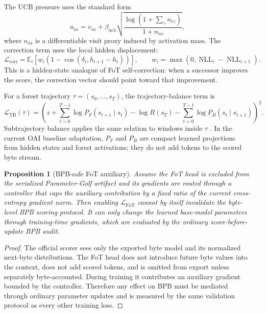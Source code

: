 \documentclass[11pt]{article}
\theoremstyle{definition}
\theoremstyle{plain}
\newtheorem{proposition}[definition]{Proposition}
\theoremstyle{remark}
\numberwithin{equation}{section}
\newcommand{\Eop}{\mathbb{E}}
\begin{document}
The UCB pressure uses the standard form
\begin{equation}
  u_{i\alpha}=v_{i\alpha}+
  \beta_{\mathrm{ucb}}
  \sqrt{
    \frac{\log(1+\sum_\gamma n_{i\gamma})}
         {1+n_{i\alpha}}
  },
\end{equation}
where $n_{i\alpha}$ is a differentiable visit proxy induced by activation mass.  The correction term uses the local hidden displacement:
\begin{equation}
  \mathcal L_{\mathrm{corr}}
  =
  \Eop_i
  \left[
    w_i\left(1-\cos(\delta_i,h_{i+1}-h_i)\right)
  \right],
  \qquad
  w_i=\max(0,\operatorname{NLL}_i-\operatorname{NLL}_{i+1}) .
\end{equation}
This is a hidden-state analogue of FoT self-correction: when a successor improves the score, the correction vector should point toward that improvement.

For a forest trajectory $\tau=(s_0,\ldots,s_T)$, the trajectory-balance term is
\begin{equation}
  \mathcal L_{\mathrm{TB}}(\tau)=
  \left(
    z+\sum_{t=0}^{T-1}\log P_F(s_{t+1}\mid s_t)
    -\log R(s_T)
    -\sum_{t=0}^{T-1}\log P_B(s_t\mid s_{t+1})
  \right)^2 .
\end{equation}
Subtrajectory balance applies the same relation to windows inside $\tau$ \cite{madan2023subtb}.  In the current OAI baseline adaptation, $P_F$ and $P_B$ are compact learned projections from hidden states and forest activations; they do not add tokens to the scored byte stream.

\begin{proposition}[BPB-safe FoT auxiliary]
Assume the FoT head is excluded from the serialized Parameter-Golf artifact and its gradients are routed through a controller that caps the auxiliary contribution by a fixed ratio of the current cross-entropy gradient norm.  Then enabling $\mathcal L_{\mathrm{FoT}}$ cannot by itself invalidate the byte-level BPB scoring protocol.  It can only change the learned base-model parameters through training-time gradients, which are evaluated by the ordinary score-before-update BPB audit.
\end{proposition}

\begin{proof}
The official scorer sees only the exported byte model and its normalized next-byte distributions.  The FoT head does not introduce future byte values into the context, does not add scored tokens, and is omitted from export unless separately byte-accounted.  During training it contributes an auxiliary gradient bounded by the controller.  Therefore any effect on BPB must be mediated through ordinary parameter updates and is measured by the same validation protocol as every other training loss.
\end{proof}
\end{document}
